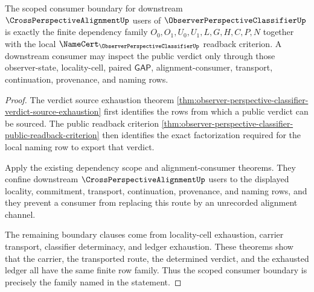 \begin{theorem}
\label{thm:observer-perspective-classifier-scoped-consumer-boundary}
The scoped consumer boundary for downstream $\CrossPerspectiveAlignmentUp$ users of $\ObserverPerspectiveClassifierUp$ is exactly the finite dependency family $O_0,O_1,U_0,U_1,L,G,H,C,P,N$ together with the local $\NameCert_{\ObserverPerspectiveClassifierUp}$ readback criterion. A downstream consumer may inspect the public verdict only through those observer-state, locality-cell, paired $\mathsf{GAP}$, alignment-consumer, transport, continuation, provenance, and naming rows.
\end{theorem}
\begin{proof}
The verdict source exhaustion theorem \autoref{thm:observer-perspective-classifier-verdict-source-exhaustion} first identifies the rows from which a public verdict can be sourced. The public readback criterion \autoref{thm:observer-perspective-classifier-public-readback-criterion} then identifies the exact factorization required for the local naming row to export that verdict.

Apply the existing dependency scope and alignment-consumer theorems. They confine downstream $\CrossPerspectiveAlignmentUp$ users to the displayed locality, commitment, transport, continuation, provenance, and naming rows, and they prevent a consumer from replacing this route by an unrecorded alignment channel.

The remaining boundary clauses come from locality-cell exhaustion, carrier transport, classifier determinacy, and ledger exhaustion. These theorems show that the carrier, the transported route, the determined verdict, and the exhausted ledger all have the same finite row family. Thus the scoped consumer boundary is precisely the family named in the statement.
\end{proof}

